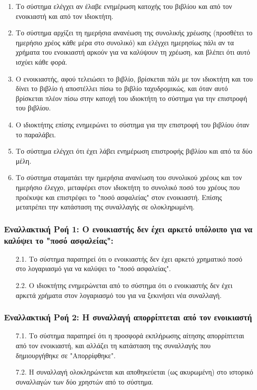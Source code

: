 \documentclass[12pt,a4paper]{article}
\begin{document}
\begin{enumerate}
    \item Το σύστημα ελέγχει αν έλαβε ενημέρωση κατοχής του βιβλίου και από τον ενοικιαστή και από τον ιδιοκτήτη.
    \item Το σύστημα αρχίζει τη ημερήσια ανανέωση της συνολικής χρέωσης (προσθέτει το ημερήσιο χρέος κάθε μέρα στο συνολικό) και ελέγχει ημερησίως πάλι αν τα χρήματα του ενοικιαστή αρκούν για να καλύψουν τη χρέωση, και βλέπει ότι αυτό ισχύει κάθε φορά.
    \item Ο ενοικιαστής, αφού τελειώσει το βιβλίο, βρίσκεται πάλι με τον ιδιοκτήτη και του δίνει το βιβλίο ή αποστέλλει πίσω το βιβλίο ταχυδρομικώς, και όταν αυτό βρίσκεται πλέον πίσω στην κατοχή του ιδιοκτήτη το σύστημα για την επιστροφή του βιβλίου.
    \item Ο ιδιοκτήτης επίσης ενημερώνει το σύστημα για την επιστροφή του βιβλίου όταν το παραλάβει.
    \item Το σύστημα ελέγχει ότι έχει λάβει ενημέρωση επιστροφής βιβλίου και από τα δύο μέλη. 
    \item Το σύστημα σταματάει την ημερήσια ανανέωση του συνολικού χρέους και τον ημερήσιο έλεγχο, μεταφέρει στον ιδιοκτήτη το συνολικό ποσό του χρέους που προέκυψε και επιστρέφει το "ποσό ασφαλείας" στον ενοικιαστή. Επίσης μετατρέπει την κατάσταση της συναλλαγής σε ολοκληρωμένη.
\end{enumerate}

\subsubsection*{Εναλλακτική Ροή 1: Ο ενοικιαστής δεν έχει αρκετό υπόλοιπο για να καλύψει το "ποσό ασφαλείας":}
\begin{enumerate}
    \item[2.1.] Το σύστημα παρατηρεί ότι ο ενοικιαστής δεν έχει αρκετό χρηματικό ποσό στο λογαριασμό για να καλύψει το "ποσό ασφαλείας".
    \item[2.2.] Ο ιδιοκτήτης ενημερώνεται από το σύστημα ότι ο ενοικιαστής δεν έχει αρκετά χρήματα στον λογαριασμό του για να ξεκινήσει νέα συναλλαγή.
\end{enumerate}

\subsubsection*{Εναλλακτική Ροή 2: Η συναλλαγή απορρίπτεται από τον ενοικιαστή}
\begin{enumerate}
    \item[7.1.] Το σύστημα παρατηρεί ότι η προσφορά εκπλήρωσης αίτησης απορρίπτεται από τον ενοικιαστή, και αλλάζει τη κατάσταση της συναλλαγής που δημιουργήθηκε σε "Απορρίφθηκε".
    \item[7.2.] Η συναλλαγή ολοκληρώνεται και αποθηκεύεται (ως ακυρωμένη) στο ιστορικό συναλλαγών των δύο χρηστών από το σύστημα.
\end{enumerate}
\end{document}
